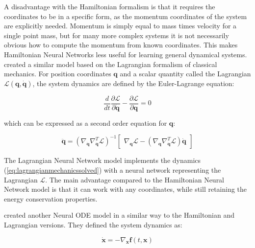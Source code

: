 \documentclass[12pt,a4paper]{book}
\begin{document}
A disadvantage with the Hamiltonian formalism is that it requires the coordinates to be in a specific form, as the momentum coordinates of the system are explicitly needed. Momentum is simply equal to mass times velocity for a single point mass, but for many more complex systems it is not necessarily obvious how to compute the momentum from known coordinates. This makes Hamiltonian Neural Networks less useful for learning general dynamical systems. \cite{lagrangiannode} created a similar model based on the Lagrangian formalism of classical mechanics. For position coordinates $\bm{q}$ and a scalar quantity called the Lagrangian $\mathcal{L}(\bm{q}, \dot{\bm{q}})$, the system dynamics are defined by the Euler-Lagrange equation:

\begin{equation}
    \frac{d}{d t} \frac{\partial \mathcal{L}}{\partial \dot{\bm{q}}} - \frac{\partial \mathcal{L}}{\partial \bm{q}} = 0
\end{equation}

\noindent which can be expressed as a second order equation for $\bm{q}$:

\begin{equation}
    \ddot{\bm{q}} = (\nabla_{\dot{\bm{q}}} \nabla_{\dot{\bm{q}}}^T \mathcal{L})^{-1} \begin{bmatrix} \nabla_{\bm{q}} \mathcal{L} - (\nabla_{\bm{q}} \nabla_{\dot{\bm{q}}}^T \mathcal{L}) \dot{\bm{q}} \end{bmatrix}
    \label{eq:lagrangianmechanicssolved}
\end{equation}

The Lagrangian Neural Network model implements the dynamics (\ref{eq:lagrangianmechanicssolved}) with a neural network representing the Lagrangian $\mathcal{L}$. The main advantage compared to the Hamiltonian Neural Network model is that it can work with any coordinates, while still retaining the energy conservation properties.

\cite{stableneuralflows} created another Neural ODE model in a similar way to the Hamiltonian and Lagrangian versions. They defined the system dynamics as:

\begin{equation}
   \dot{\bm{x}} = - \nabla_{\bm{x}} \bm{f}(t, \bm{x})
\end{equation}
\end{document}
